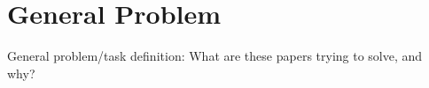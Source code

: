 \section{General Problem}
\label{sec:general problem}

General problem/task definition: What are these papers trying to solve, and why?